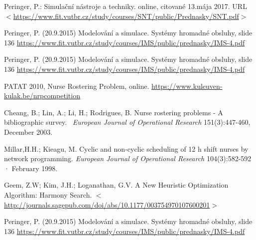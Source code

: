 \documentclass[a4paper, 14pt]{article}
\begin{document}
\newpage
\begin{thebibliography}{9}
 	Peringer, P.: Simulační nástroje a techniky. online, citované 13.mája 2017. URL
	 \href{https://www.fit.vutbr.cz/study/courses/SNT/public/Prednasky/SNT.pdf}{$<$https://www.fit.vutbr.cz/study/courses/SNT/public/Prednasky/SNT.pdf$>$}
	
 	Peringer, P. (20.9.2015) Modelování a simulace. Systémy hromadné obsluhy, slide 136
	 \href{https://www.fit.vutbr.cz/study/courses/IMS/public/prednasky/IMS-4.pdf}{https://www.fit.vutbr.cz/study/courses/IMS/public/prednasky/IMS-4.pdf}

 	Peringer, P. (20.9.2015) Modelování a simulace. Systémy hromadné obsluhy, slide 136
	 \href{https://www.fit.vutbr.cz/study/courses/IMS/public/prednasky/IMS-4.pdf}{https://www.fit.vutbr.cz/study/courses/IMS/public/prednasky/IMS-4.pdf}
	 
 	PATAT 2010, Nurse Rostering Problem, online.
	 \href{https://www.kuleuven-kulak.be/nrpcompetition}{https://www.kuleuven-kulak.be/nrpcompetition}

 	Cheang, B.; Lin, A.; Li, H.; Rodrigues, B. Nurse rostering problems - A bibliographic survey. \emph{ European Journal of Operational Research} 151(3):447-460, December 2003.  

 	Millar,H.H.; Kieagu, M. Cyclic and non-cyclic scheduling of 12 h shift nurses by network programming. \emph{European Journal of Operational Research} 104(3):582-592 · February 1998.

 	Geem, Z.W; Kim, J.H.; Loganathan, G.V. A New Heuristic Optimization Algorithm: Harmony Search.
	 \href{http://journals.sagepub.com/doi/abs/10.1177/003754970107600201}{$<$http://journals.sagepub.com/doi/abs/10.1177/003754970107600201$>$}
	 
 	Peringer, P. (20.9.2015) Modelování a simulace. Systémy hromadné obsluhy, slide 136
	 \href{https://www.fit.vutbr.cz/study/courses/IMS/public/prednasky/IMS-4.pdf}{https://www.fit.vutbr.cz/study/courses/IMS/public/prednasky/IMS-4.pdf}


\end{thebibliography}
\end{document}
